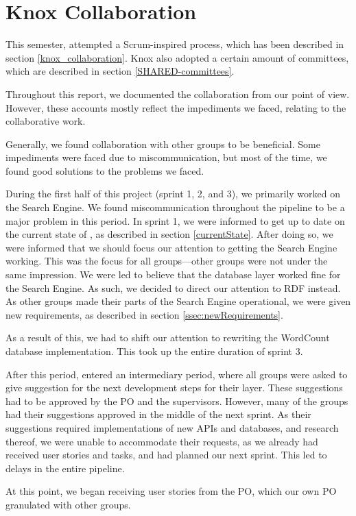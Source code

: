 \section{Knox Collaboration}
This semester, \knox{} attempted a Scrum-inspired process, which has been described in section \ref{knox_collaboration}. Knox also adopted a certain amount of committees, which are described in section \ref{SHARED-committees}.

Throughout this report, we documented the \knox{} collaboration from our point of view. However, these accounts mostly reflect the impediments we faced, relating to the collaborative work.

Generally, we found collaboration with other groups to be beneficial. Some impediments were faced due to miscommunication, but most of the time, we found good solutions to the problems we faced.

During the first half of this project (sprint 1, 2, and 3), we primarily worked on the Search Engine. We found miscommunication throughout the pipeline to be a major problem in this period. In sprint 1, we were informed to get up to date on the current state of \knox{}, as described in section \ref{currentState}. After doing so, we were informed that we should focus our attention to getting the Search Engine working. This was the focus for all groups---other groups were not under the same impression. We were led to believe that the database layer worked fine for the Search Engine. As such, we decided to direct our attention to RDF instead. As other groups made their parts of the Search Engine operational, we were given new requirements, as described in section \ref{ssec:newRequirements}.

As a result of this, we had to shift our attention to rewriting the WordCount database implementation. This took up the entire duration of sprint 3.

After this period, \knox{} entered an intermediary period, where all groups were asked to give suggestion for the next development steps for their layer. These suggestions had to be approved by the \knox{} PO and the \knox{} supervisors. However, many of the groups had their suggestions approved in the middle of the next sprint. As their suggestions required implementations of new APIs and databases, and research thereof, we were unable to accommodate their requests, as we already had received user stories and tasks, and had planned our next sprint. This led to delays in the entire pipeline.

At this point, we began receiving user stories from the \knox{} PO, which our own PO granulated with other \knox{} groups.

